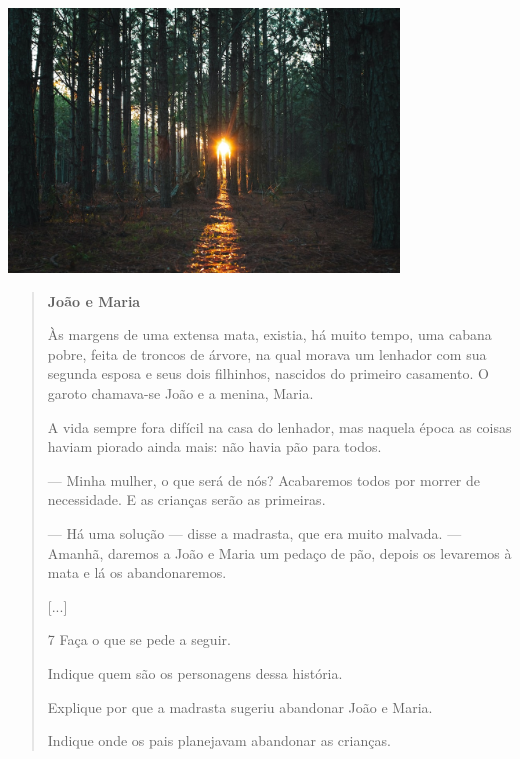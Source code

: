 \begin{boxlist}
\includegraphics[width=4.08333in,height=2.76048in]{media/image3.jpeg}

\begin{quote}
\textbf{João e Maria}

Às margens de uma extensa mata, existia, há muito tempo, uma cabana
pobre, feita de troncos de árvore, na qual morava um lenhador com sua segunda esposa e
seus dois filhinhos, nascidos do primeiro casamento. O garoto chamava-se João e a
menina, Maria.

A vida sempre fora difícil na casa do lenhador, mas naquela época as
coisas haviam piorado ainda mais: não havia pão para todos.

--- Minha mulher, o que será de nós? Acabaremos todos por morrer
de necessidade. E as crianças serão as primeiras.

--- Há uma solução --- disse a madrasta, que era muito
malvada. --- Amanhã, daremos a João e Maria um pedaço de pão, depois os
levaremos à mata e lá os abandonaremos.

{[}...{]}


\num{7} Faça o que se pede a seguir.

\begin{escolha}
\item Indique quem são os personagens dessa história.


\item Explique por que a madrasta sugeriu abandonar João e Maria.


\item Indique onde os pais planejavam abandonar as crianças.


\end{escolha}
\end{quote}
\end{boxlist}
